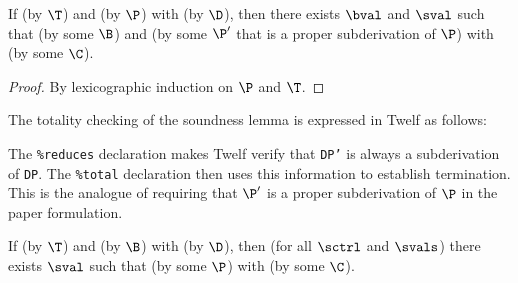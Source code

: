 \begin{lemma}[Soundness]
\label{lem:soundness-bs}
If  (by $\T$) and \ssteps{\sctrl \stkcons \fr{\senv}{\sprog}}{\svals}{\stknil}{[\sval']} (by $\P$) with \cor{\benv}{\senv} (by $\D$), then there exists $\bval$ and $\sval$ such that \bev{\benv}{\bexp}{\bval} (by some $\B$) and  (by some $\P'$ that is a proper subderivation of $\P$) with \cor{\bval}{\sval} (by some $\C$).
\end{lemma}


\begin{proof}
By lexicographic induction on $\P$ and $\T$.
\end{proof}

\Twelf
The totality checking of the soundness lemma is expressed in Twelf as follows:

The \texttt{\%reduces} declaration makes Twelf verify that \texttt{DP'} is always a subderivation of \texttt{DP}.
The \texttt{\%total} declaration then uses this information to establish termination.
This is the analogue of requiring that $\P'$ is a proper subderivation of $\P$ in the paper formulation.

\begin{lemma}[Completeness]
\label{lem:completeness-bs}
If  (by $\T$) and \bev{\benv}{\bexp}{\bval} (by $\B$) with \cor{\benv}{\senv} (by $\D$), then (for all $\sctrl$ and $\svals$) there exists $\sval$ such that  (by some $\P$) with \cor{\bval}{\sval} (by some $\C$).
\end{lemma}


